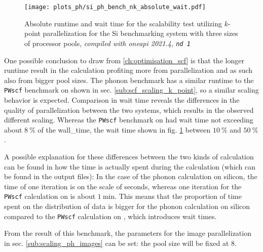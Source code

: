 \documentclass[main.tex]{subfiles}
\begin{document}
\begin{figure}[htb!]
    \centering
    \texttt{[image: plots\_ph/si\_ph\_bench\_nk\_absolute\_wait.pdf]}
    \caption{Absolute runtime and wait time for the scalability test utilizing \(k\)-point parallelization for the Si benchmarking system with three sizes of processor pools, \emph{\QE compiled with \gls{oneapi} 2021.4, \texttt{nd 1}}}
    \label{fig:scaling_ph_nk_si_absolute_wait}
\end{figure}
One possible conclusion to draw from \cref{ch:optimisation_scf} is that the longer runtime result in the calculation profiting more from parallelization and as such also from bigger pool sizes.
The phonon benchmark has a similar runtime to the \texttt{PWscf} benchmark on \TaS shown in sec. \ref{sub:scf_scaling_k_point}, so a similar scaling behavior is expected.
Comparison in wait time reveals the differences in the quality of parallelization between the two systems, which results in the observed different scaling. 
Whereas the \texttt{PWscf} benchmark on \TaS had wait time not exceeding about \(\SI{8}{\percent}\) of the \gls{wall_time}, the wait time shown in fig. \ref{fig:scaling_ph_nk_si_absolute_wait} between \(\SI{10}{\percent}\) and \(\SI{50}{\percent}\).

A possible explanation for these differences between the two kinds of calculation can be found in how the time is actually spent during the calculation (which can be found in the \QE output files):
In the case of the phonon calculation on silicon, the time of one iteration is on the scale of seconds, whereas one iteration for the \texttt{PWscf} calculation on \TaS is about \(\SI{1}{\minute}\).
This means that the proportion of time spent on the distribution of data is bigger for the phonon calculation on silicon compared to the \texttt{PWscf} calculation on \TaS, which introduces wait times.

From the result of this benchmark, the parameters for the image parallelization in sec. \ref{sub:scaling_ph_images} can be set: the pool size will be fixed at 8.
\end{document}
